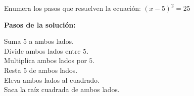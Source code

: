 Enumera los pasos que resuelven la ecuación: $(x-5)^2=25$

\textbf{Pasos de la solución:}

\fillin[2][0.5cm] Suma $5$ a ambos lados.\\
\fillin[-][0.5cm] Divide ambos lados entre $5$.\\
\fillin[-][0.5cm] Multiplica ambos lados por $5$.\\
\fillin[-][0.5cm] Resta $5$ de ambos lados.\\
\fillin[-][0.5cm] Eleva ambos lados al cuadrado.\\
\fillin[1][0.5cm] Saca la raíz cuadrada de ambos lados.\\
